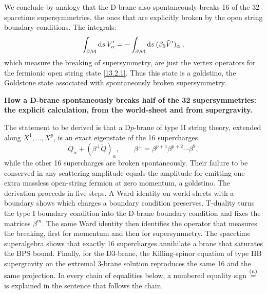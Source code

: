 We conclude by analogy that the D-brane also spontaneously breaks 16 of the 32 spacetime supersymmetries, the ones that are explicitly broken by the open string boundary conditions. The integrals:
\begin{equation}
	\int_{\partial\mathcal{M}}\mathrm{d} s\:V_\alpha' = -\int_{\partial\mathcal{M}}\mathrm{d} s\:(\beta_9\tilde{V}')_\alpha \:, \label{13.2.4}
\end{equation}
which measure the breaking of supersymmetry, are just the vertex operators for the fermionic open string state \eqref{13.2.1}. Thus this state is a goldstino, the Goldstone state associated with spontaneously broken supersymmetry.
\begin{tcolorbox}[breakable]
	\begin{remark}
		\textbf{How a D-brane spontaneously breaks half of the 32 supersymmetries:
		the explicit calculation, from the world-sheet and from supergravity.}
		\medskip

The statement to be derived is that a D$p$-brane of type II string theory, extended along $X^1,\dots,X^p$, is an exact eigenstate of the 16 supercharges
\begin{equation}
Q_\alpha + (\beta^\perp \tilde Q)_\alpha , \qquad \beta^\perp = \beta^{p+1}\beta^{p+2}\cdots\beta^{9},
\tag{D.1}\label{unbroken}
\end{equation}
while the other 16 supercharges are broken spontaneously. Their failure to be conserved in any scattering amplitude equals the amplitude for emitting one extra massless open-string fermion at zero momentum, a goldstino. The derivation proceeds in five steps. A Ward identity on world-sheets with a boundary shows which charges a boundary condition preserves. T-duality turns the type I boundary condition into the D-brane boundary condition and fixes the matrices $\beta^m$. The same Ward identity then identifies the operator that measures the breaking, first for momentum and then for supersymmetry. The spacetime superalgebra shows that exactly 16 supercharges annihilate a brane that saturates the BPS bound. Finally, for the D3-brane, the Killing-spinor equation of type IIB supergravity on the extremal 3-brane solution reproduces the same 16 and the same projection. In every chain of equalities below, a numbered equality sign $\overset{(n)}{=}$ is explained in the sentence that follows the chain.


\end{remark}
\end{tcolorbox}

